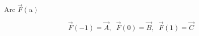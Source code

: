 \documentclass[aps,12pt]{revtex4}
\begin{document}
Arc $\vec{F}(u)$

\begin{equation}
	\vec{F}(-1) = \vec{A},\;\; \vec{F}(0) = \vec{B}, \;\; \vec{F}(1) = \vec{C}
\end{equation}
\end{document}

